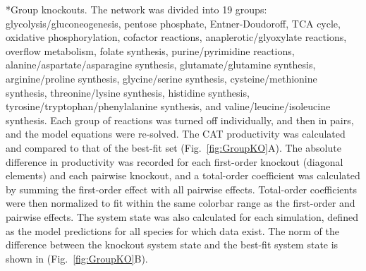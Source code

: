 \documentclass[12pt]{article}
\makeatletter
\renewcommand\subsection{\@startsection
	{subsection}{2}{0mm}
	{-0.05in}
	{-0.5\baselineskip}
	{\normalfont\normalsize\bfseries}}
\newcommand{\norm}[1]{\left\lVert#1\right\rVert}
\makeatother
\begin{document}
\subsection*{Group knockouts.}
The network was divided into 19 groups: glycolysis\slash gluconeogenesis, pentose phosphate, Entner-Doudoroff, TCA cycle, oxidative phosphorylation, cofactor reactions, anaplerotic\slash glyoxylate reactions, overflow metabolism, folate synthesis, purine\slash pyrimidine reactions, alanine\slash aspartate\slash asparagine synthesis, glutamate\slash glutamine synthesis, arginine\slash proline synthesis, glycine\slash serine synthesis, cysteine\slash methionine synthesis, threonine\slash lysine synthesis, histidine synthesis, tyrosine\slash tryptophan\slash phenylalanine synthesis, and valine\slash leucine\slash isoleucine synthesis.
Each group of reactions was turned off individually, and then in pairs, and the model equations were re-solved.
The CAT productivity was calculated and compared to that of the best-fit set (Fig.~\ref{fig:GroupKO}A).
The absolute difference in productivity was recorded for each first-order knockout (diagonal elements) and each pairwise knockout, and a total-order coefficient was calculated by summing the first-order effect with all pairwise effects.
Total-order coefficients were then normalized to fit within the same colorbar range as the first-order and pairwise effects.
The system state was also calculated for each simulation, defined as the model predictions for all species for which data exist.
The norm of the difference between the knockout system state and the best-fit system state is shown in (Fig.~\ref{fig:GroupKO}B).

\end{document}
